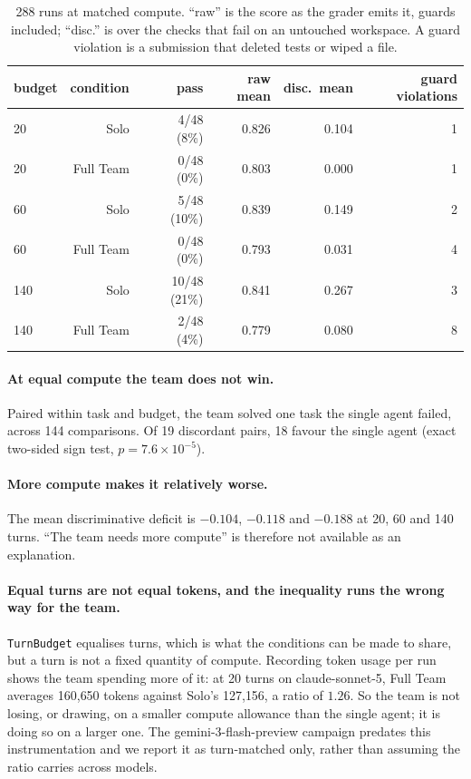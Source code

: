 \documentclass[11pt]{article}
\begin{document}
\begin{table}[t]
\centering\small
\begin{tabular}{lrrrrr}
\toprule
budget & condition & pass & raw mean & disc.\ mean & guard violations \\
\midrule
20  & Solo      & 4/48 \ (8\%)  & 0.826 & 0.104 & 1 \\
20  & Full Team & 0/48 \ (0\%)  & 0.803 & 0.000 & 1 \\
60  & Solo      & 5/48 \ (10\%) & 0.839 & 0.149 & 2 \\
60  & Full Team & 0/48 \ (0\%)  & 0.793 & 0.031 & 4 \\
140 & Solo      & 10/48 (21\%)  & 0.841 & 0.267 & 3 \\
140 & Full Team & 2/48 \ (4\%)  & 0.779 & 0.080 & 8 \\
\bottomrule
\end{tabular}
\caption{288 runs at matched compute. ``raw'' is the score as the grader emits
it, guards included; ``disc.'' is over the checks that fail on an untouched
workspace. A guard violation is a submission that deleted tests or wiped a file.}
\label{tab:budget}
\end{table}

\paragraph{At equal compute the team does not win.} Paired within task and
budget, the team solved one task the single agent failed, across 144
comparisons. Of 19 discordant pairs, 18 favour the single agent (exact
two-sided sign test, $p = 7.6\times10^{-5}$).

\paragraph{More compute makes it relatively worse.} The mean discriminative
deficit is $-0.104$, $-0.118$ and $-0.188$ at 20, 60 and 140 turns. ``The team
needs more compute'' is therefore not available as an explanation.

\paragraph{Equal turns are not equal tokens, and the inequality runs the wrong
way for the team.} \texttt{TurnBudget} equalises turns, which is what the
conditions can be made to share, but a turn is not a fixed quantity of compute.
Recording token usage per run shows the team spending more of it: at 20 turns on
claude-sonnet-5, Full Team averages 160{,}650 tokens against Solo's 127{,}156, a
ratio of $1.26$. So the team is not losing, or drawing, on a smaller compute
allowance than the single agent; it is doing so on a larger one. The
gemini-3-flash-preview campaign predates this instrumentation and we report it as
turn-matched only, rather than assuming the ratio carries across models.
\end{document}
